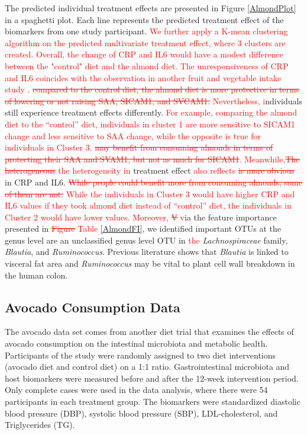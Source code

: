 \documentclass[smallextended]{svjour3}
\newcommand{\bg}[1]{\textcolor{red}{#1}}
\begin{document}
The predicted individual treatment effects are presented in Figure \ref{AlmondPlot} in a spaghetti plot. Each line represents the predicted treatment effect of the biomarkers from one study participant. \bg{We further apply a K-mean clustering algorithm on the predicted multivariate treatment effect, where 3 clusters are created. Overall, the change of CRP and IL6 would have \bg{a} modest difference between the "control" diet and the almond diet. The unresponsiveness of CRP and IL6 coincides with the observation in another fruit and vegetable intake study \citep{nadeem2014serum}. 
\st{compared to the control diet, the almond diet is more protective in terms of lowering or not raising SAA, SICAM1, and SVCAM1.}}
\bg{Nevertheless, i}ndividuals still experience treatment effects differently. \bg{For example, comparing the almond diet to the ``control'' diet, individuals in cluster 1  are more sensitive to SICAM1 change and less sensitive to SAA change, while the opposite is true for individuals in Cluster 3. \st{may benefit from consuming almonds in terms of protecting their SAA and SVAM1, but not as much for SICAM1}. Meanwhile,\st{The heterogeneous} the heterogeneity in} treatment effect \bg{also reflects \st{is more obvious}} in CRP and IL6. \bg{\st{While people could benefit more from consuming almonds, some of them are not.} While the individuals in Cluster 3 would have higher CRP and IL6 values if they took almond diet instead of ``control'' diet, the individuals in Cluster 2 would have lower values. Moreover, \st{V} v}ia the feature importance presented in \bg{\st{Figure} Table} \ref{AlmondFI}, we identified important OTUs at the genus level are an unclassified genus level OTU in \bg{the} \textit{Lachnospiraceae} family, \textit{Blautia}, and \textit{Ruminococcus}. Previous literature shows that \textit{Blautia} is linked to visceral fat area \citep{ozato2019blautia} and \textit{Ruminococcus} may be vital to plant cell wall breakdown in the human colon\citep{ze2012ruminococcus}.

\subsection{Avocado Consumption Data}
The avocado data set comes from another diet trial \citep{Avocado} that examines the effects of avocado consumption on the intestinal microbiota and metabolic health. Participants of the study were randomly assigned to two diet interventions (avocado diet and control diet) on a 1:1 ratio. Gastrointestinal microbiota and host biomarkers were measured before and after the 12-week intervention period. Only complete cases were used in the data analysis, where there were 54 participants in each treatment group. The biomarkers were standardized diastolic blood pressure (DBP), systolic blood pressure (SBP), LDL-cholesterol, and Triglycerides (TG).
\end{document}
